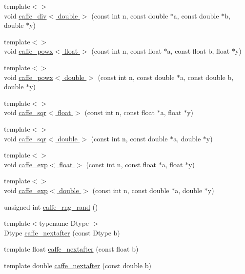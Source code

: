 \begin{DoxyCompactItemize}
\item 
{\footnotesize template$<$$>$ }\\void \hyperlink{namespacecaffe_a6aff3d4f403573c6116ea52e0875667c}{caffe\+\_\+div$<$ double $>$} (const int n, const double $\ast$a, const double $\ast$b, double $\ast$y)
\item 
{\footnotesize template$<$$>$ }\\void \hyperlink{namespacecaffe_ac63faf91a74ed26c21995906ffc05aa4}{caffe\+\_\+powx$<$ float $>$} (const int n, const float $\ast$a, const float b, float $\ast$y)
\item 
{\footnotesize template$<$$>$ }\\void \hyperlink{namespacecaffe_abc32d9c6721f0a864270552957c513af}{caffe\+\_\+powx$<$ double $>$} (const int n, const double $\ast$a, const double b, double $\ast$y)
\item 
{\footnotesize template$<$$>$ }\\void \hyperlink{namespacecaffe_add3fbffad218dec24176292a0fb2436a}{caffe\+\_\+sqr$<$ float $>$} (const int n, const float $\ast$a, float $\ast$y)
\item 
{\footnotesize template$<$$>$ }\\void \hyperlink{namespacecaffe_a5b56a825d8809e999548bbfe94b3bb5b}{caffe\+\_\+sqr$<$ double $>$} (const int n, const double $\ast$a, double $\ast$y)
\item 
{\footnotesize template$<$$>$ }\\void \hyperlink{namespacecaffe_a0553e22b5a2615ce54bb22bab6a4df15}{caffe\+\_\+exp$<$ float $>$} (const int n, const float $\ast$a, float $\ast$y)
\item 
{\footnotesize template$<$$>$ }\\void \hyperlink{namespacecaffe_ab934b2004cda176643660f2029ff9fa2}{caffe\+\_\+exp$<$ double $>$} (const int n, const double $\ast$a, double $\ast$y)
\item 
unsigned int \hyperlink{namespacecaffe_a9cf246cbdccdda0a777438c1d1202dbd}{caffe\+\_\+rng\+\_\+rand} ()
\item 
{\footnotesize template$<$typename Dtype $>$ }\\Dtype \hyperlink{namespacecaffe_a105d7928b8db2c72aa13b50ffb16df87}{caffe\+\_\+nextafter} (const Dtype b)
\item 
template float \hyperlink{namespacecaffe_a15b19ccf3032875f3963dc45bdca5b58}{caffe\+\_\+nextafter} (const float b)
\item 
template double \hyperlink{namespacecaffe_aa0ed3e47a272cc59fbf35d315a06cff5}{caffe\+\_\+nextafter} (const double b)

\end{DoxyCompactItemize}
